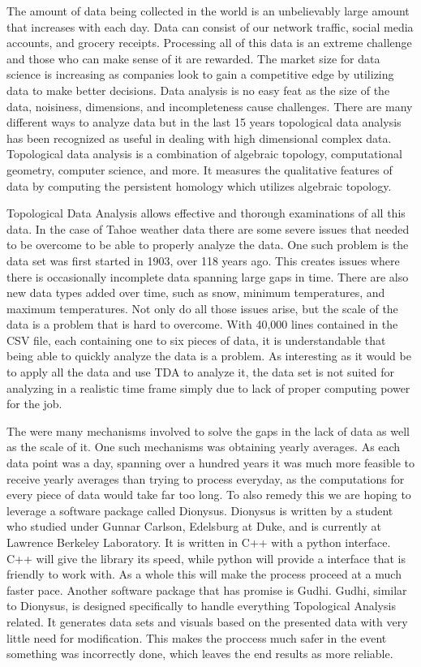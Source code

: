 \documentclass[12pt]{report}
\begin{document}
The amount of data being collected in the world is an unbelievably large amount that increases with each day. Data can consist of our network traffic, social media accounts, and grocery receipts. Processing all of this data is an extreme challenge and those who can make sense of it are rewarded. The market size for data science is increasing as companies look to gain a competitive edge by utilizing data to make better decisions. Data analysis is no easy feat as the size of the data, noisiness, dimensions, and incompleteness cause challenges. There are many different ways to analyze data but in the last 15 years topological data analysis has been recognized as useful in dealing with high dimensional complex data. Topological data analysis is a combination of algebraic topology, computational geometry, computer science, and more. It measures the qualitative features of data by computing the persistent homology which utilizes algebraic topology.
 
Topological Data Analysis allows effective and thorough examinations of all this data. In the case of Tahoe weather data there are some severe issues that needed to be overcome to be able to properly analyze the data. One such problem is the data set was first started in 1903, over 118 years ago. This creates issues where there is occasionally incomplete data spanning large gaps in time. There are also new data types added over time, such as snow, minimum temperatures, and maximum temperatures. Not only do all those issues arise, but the scale of the data is a problem that is hard to overcome. With 40,000 lines contained in the CSV file, each containing one to six pieces of data, it is understandable that being able to quickly analyze the data is a problem. As interesting as it would be to apply all the data and use TDA to analyze it, the data set is not suited for analyzing in a realistic time frame simply due to lack of proper computing power for the job.
    
The were many mechanisms involved to solve the gaps in the lack of data as well as the scale of it. One such mechanisms was obtaining yearly averages. As each data point was a day, spanning over a hundred years it was much more feasible to receive yearly averages than trying to process everyday, as the computations for every piece of data would take far too long. To also remedy this we are hoping to leverage a software package called Dionysus. Dionysus is written by a student who studied under Gunnar Carlson, Edelsburg at Duke, and is currently at Lawrence Berkeley Laboratory. It is written in C++ with a python interface. C++ will give the library its speed, while python will provide a interface that is friendly to work with. As a whole this will make the process proceed at a much faster pace. Another software package that has promise is Gudhi. Gudhi, similar to Dionysus, is designed specifically to handle everything Topological Analysis related. It generates data sets and visuals based on the presented data with very little need for modification. This makes the proccess much safer in the event something was incorrectly done, which leaves the end results as more reliable.
\end{document}
